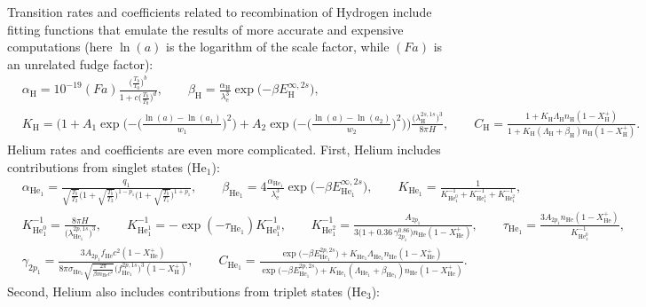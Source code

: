 \documentclass{aa}
\newcommand\el{\mathrm{e}}
\newcommand\Hy{\mathrm{H}}
\newcommand\He{\mathrm{He}}
\newcommand\Hesin{{\mathrm{He}_1}}
\newcommand\Hetri{{\mathrm{He}_3}}
\begin{document}
Transition rates and coefficients related to recombination of Hydrogen include fitting functions that emulate the results of more accurate and expensive computations (here $\ln(a)$ is the logarithm of the scale factor, while $(Fa)$ is an unrelated fudge factor):
\begin{align*}
&
\alpha_\Hy = 10^{-19} (Fa) \frac{\Big( \frac{T_b}{T_0} \Big)^b }{ 1 + c \Big(\frac{T_b}{T_0}\Big)^d }, \qquad
\beta_\Hy = \frac{\alpha_\Hy}{\lambda_\el^3} \exp\big({-\beta E_\Hy^{\infty,2s}}\big), \\
&
K_\Hy = \Bigg( 1 + A_1 \exp\Bigg({-\bigg(\frac{\ln(a)-\ln(a_1)}{w_1}\bigg)^2}\Bigg) + A_2 \exp\Bigg({-\bigg(\frac{\ln(a)-\ln(a_2)}{w_2}\bigg)^2}\Bigg) \Bigg) \frac{\big(\lambda_\Hy^{2s,1s}\big)^3}{8\pi H}, \qquad
C_\Hy = \frac{1 + K_\Hy \Lambda_\Hy n_\Hy (1-X_\Hy^+) }{ 1 + K_\Hy (\Lambda_\Hy+\beta_\Hy) n_\Hy (1-X_\Hy^+) }.
\end{align*}
Helium rates and coefficients are even more complicated. First, Helium includes contributions from singlet states ($\Hesin$):
\begin{align*}
&
\alpha_\Hesin = \frac{q_1 }{ \sqrt{\frac{T_b}{T_2}} \Big(1+\sqrt{\frac{T_b}{T_2}}\Big)^{1-p_1} \Big(1+\sqrt{\frac{T_b}{T_1}}\Big)^{1+p_1} }, \qquad
\beta_\Hesin = 4 \frac{\alpha_\Hesin }{ \lambda_\el^3 } \exp\big({-\beta E_\Hesin^{\infty,2s}}\big), \qquad
K_\Hesin = \frac{1}{K_{\He_1^0}^{-1} + K_{\He_1^1}^{-1} + K_{\He_1^2}^{-1}}, \\
&
K_{\He_1^0}^{-1} = \frac{8 \pi H }{ \big(\lambda_\Hesin^{2p,1s}\big)^3 }, \qquad
K_{\He_1^1}^{-1} = -\exp(-\tau_\Hesin) K_{\He_1^0}^{-1}, \qquad
K_{\He_1^2}^{-1} = \frac{A_{2p_1} }{ 3 \big(1+0.36 \, \gamma_{2p_1}^{0.86}\big) n_\He (1-X_\He^+) }, \qquad
\tau_\Hesin = \frac{ 3 A_{2p_1} n_\He (1-X_\He^+) }{ K_{\He_1^0}^{-1} }, \\
&
\gamma_{2p_1} = \frac{ 3 A_{2p_1} f_\He c^2 (1-X_\He^+) }{ 8\pi \sigma_{\Hesin} \sqrt{\frac{2 \pi}{\beta m_\He c^2}} \big(f_\Hesin^{2p,1s}\big)^3 (1-X_\Hy^+) }, \qquad
C_\Hesin = \frac{\exp\big({-\beta E_\Hesin^{2p,2s}}\big) + K_\Hesin \Lambda_\Hesin n_\He (1-X_\He^+) }{ \exp\big({-\beta E_\Hesin^{2p,2s}}\big) + K_\Hesin (\Lambda_\Hesin+\beta_\Hesin) n_\He (1-X_\He^+) }.
\end{align*}
Second, Helium also includes contributions from triplet states ($\Hetri$):
\end{document}
